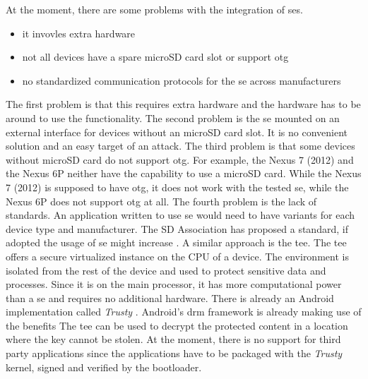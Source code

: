 \newline
At the moment, there are some problems with the integration of \gls{se}s.
\begin{itemize}
  \item it invovles extra hardware
  \item not all devices have a spare microSD card slot or support \gls{otg}
  \item no standardized communication protocols for the \gls{se} across manufacturers
\end{itemize}
The first problem is that this requires extra hardware and the hardware has to be around to use the functionality.
\newline
The second problem is the \gls{se} mounted on an external interface for devices without an microSD card slot.
It is no convenient solution and an easy target of an attack.
\newline
The third problem is that some devices without microSD card do not support \gls{otg}.
For example, the Nexus 7 (2012) and the Nexus 6P neither have the capability to use a microSD card.
While the Nexus 7 (2012) is supposed to have \gls{otg}, it does not work with the tested \gls{se}, while the Nexus 6P does not support \gls{otg} at all.
\newline
The fourth problem is the lack of standards.
An application written to use \gls{se} would need to have variants for each device type and manufacturer.
The SD Association has proposed a standard, if adopted the usage of \gls{se} might increase \cite{smartSD}.
\newline
\newline
A similar approach is the \gls{tee}.
The \gls{tee} offers a secure virtualized instance on the CPU of a device.
The environment is isolated from the rest of the device and used to protect sensitive data and processes.
Since it is on the main processor, it has more computational power than a \gls{se} and requires no additional hardware.
There is already an Android implementation called \textit{Trusty} \cite{trusty}.
Android’s \gls{drm} framework is already making use of the benefits
The \gls{tee} can be used to decrypt the protected content in a location where the key cannot be stolen.
At the moment, there is no support for third party applications since the applications have to be packaged with the \textit{Trusty} kernel, signed and verified by the bootloader. \cite{trusty} \cite{teeGlobal}
